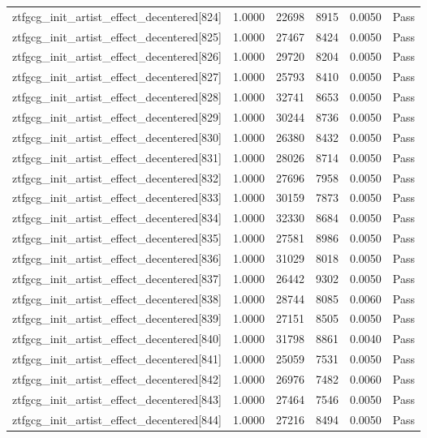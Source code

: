 \begin{table}[htbp]
\begin{tabular}{llrrll}
ztfgcg\_init\_artist\_effect\_decentered[824] & 1.0000 & 22698 & 8915 & 0.0050 & Pass \\
ztfgcg\_init\_artist\_effect\_decentered[825] & 1.0000 & 27467 & 8424 & 0.0050 & Pass \\
ztfgcg\_init\_artist\_effect\_decentered[826] & 1.0000 & 29720 & 8204 & 0.0050 & Pass \\
ztfgcg\_init\_artist\_effect\_decentered[827] & 1.0000 & 25793 & 8410 & 0.0050 & Pass \\
ztfgcg\_init\_artist\_effect\_decentered[828] & 1.0000 & 32741 & 8653 & 0.0050 & Pass \\
ztfgcg\_init\_artist\_effect\_decentered[829] & 1.0000 & 30244 & 8736 & 0.0050 & Pass \\
ztfgcg\_init\_artist\_effect\_decentered[830] & 1.0000 & 26380 & 8432 & 0.0050 & Pass \\
ztfgcg\_init\_artist\_effect\_decentered[831] & 1.0000 & 28026 & 8714 & 0.0050 & Pass \\
ztfgcg\_init\_artist\_effect\_decentered[832] & 1.0000 & 27696 & 7958 & 0.0050 & Pass \\
ztfgcg\_init\_artist\_effect\_decentered[833] & 1.0000 & 30159 & 7873 & 0.0050 & Pass \\
ztfgcg\_init\_artist\_effect\_decentered[834] & 1.0000 & 32330 & 8684 & 0.0050 & Pass \\
ztfgcg\_init\_artist\_effect\_decentered[835] & 1.0000 & 27581 & 8986 & 0.0050 & Pass \\
ztfgcg\_init\_artist\_effect\_decentered[836] & 1.0000 & 31029 & 8018 & 0.0050 & Pass \\
ztfgcg\_init\_artist\_effect\_decentered[837] & 1.0000 & 26442 & 9302 & 0.0050 & Pass \\
ztfgcg\_init\_artist\_effect\_decentered[838] & 1.0000 & 28744 & 8085 & 0.0060 & Pass \\
ztfgcg\_init\_artist\_effect\_decentered[839] & 1.0000 & 27151 & 8505 & 0.0050 & Pass \\
ztfgcg\_init\_artist\_effect\_decentered[840] & 1.0000 & 31798 & 8861 & 0.0040 & Pass \\
ztfgcg\_init\_artist\_effect\_decentered[841] & 1.0000 & 25059 & 7531 & 0.0050 & Pass \\
ztfgcg\_init\_artist\_effect\_decentered[842] & 1.0000 & 26976 & 7482 & 0.0060 & Pass \\
ztfgcg\_init\_artist\_effect\_decentered[843] & 1.0000 & 27464 & 7546 & 0.0050 & Pass \\
ztfgcg\_init\_artist\_effect\_decentered[844] & 1.0000 & 27216 & 8494 & 0.0050 & Pass \\

\end{tabular}
\end{table}
